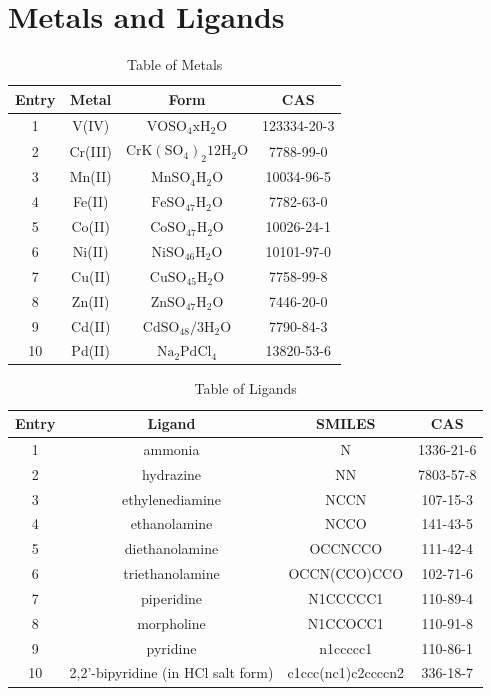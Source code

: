 \section{Metals and Ligands}
\begin{table}[!h]
\begin{center}
\begin{tabular}{c|c|c|c}
Entry & Metal & Form & CAS \\
\hline
1 & V(IV) & $\mathrm{VOSO_4 xH_2O}$ & 123334-20-3\\
2 & Cr(III) & $\mathrm{CrK(SO_4)_2 12H_2O}$ & 7788-99-0\\
3 & Mn(II) & $\mathrm{MnSO_4H_2O}$ & 10034-96-5\\
4 & Fe(II) & $\mathrm{FeSO_47H_2O}$ & 7782-63-0\\
5 & Co(II) & $\mathrm{CoSO_47H_2O}$ & 10026-24-1\\
6 & Ni(II) & $\mathrm{NiSO_46H_2O}$ & 10101-97-0\\
7 & Cu(II) & $\mathrm{CuSO_45H_2O}$ & 7758-99-8\\
8 & Zn(II) & $\mathrm{ZnSO_47H_2O}$ & 7446-20-0\\
9 & Cd(II) & $\mathrm{CdSO_48/3H_2O}$ & 7790-84-3\\
10 & Pd(II) & $\mathrm{Na_2PdCl_4}$ & 13820-53-6\\
\end{tabular}
\caption{Table of Metals}
\label{metal_table}
\end{center}
\end{table}

\begin{table}[!h]
\begin{center}
\begin{tabular}{c|c|c|c}
Entry & Ligand & SMILES & CAS \\
\hline
1 & ammonia & N & 1336-21-6\\
2 & hydrazine & NN & 7803-57-8\\
3 & ethylenediamine & NCCN & 107-15-3\\
4 & ethanolamine & NCCO & 141-43-5\\
5 & diethanolamine & OCCNCCO & 111-42-4\\
6 & triethanolamine & OCCN(CCO)CCO & 102-71-6\\
7 & piperidine & N1CCCCC1 & 110-89-4\\
8 & morpholine & N1CCOCC1 & 110-91-8\\
9 & pyridine & n1ccccc1 & 110-86-1\\
10 & 2,2'-bipyridine (in HCl salt form) & c1ccc(nc1)c2ccccn2 & 336-18-7\\
\end{tabular}
\caption{Table of Ligands}
\label{ligand_table}
\end{center}
\end{table}